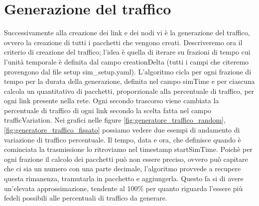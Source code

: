 \documentclass[binding=0.6cm]{sapthesis}
\begin{document}
\section{Generazione del traffico}
Successivamente alla creazione dei link e dei nodi vi è la generazione del traffico, ovvero la creazione di tutti i pacchetti che vengono
creati. Descriveremo ora il criterio di creazione del traffico; l'idea è quella di iterare su frazioni di tempo cui l'unità temporale è definita
 dal campo creationDelta (tutti i campi che citeremo provengono dal file setup sim\_setup.yaml). L'algoritmo cicla per ogni frazione di 
 tempo per la durata della generazione, definita nel campo
 simTime e per ciascuna calcola un quantitativo di pacchetti, proporzionale alla 
percentuale di traffico, per ogni link presente nella rete. Ogni secondo trascorso viene cambiata la percentuale di traffico di ogni link secondo
la scelta fatta nel campo trafficVariation. Nei grafici nelle figure \ref{fig:generatore_traffico_random}, \ref{fig:generatore_traffico_fissato} possiamo vedere due esempi di andamento di variazione di traffico percentuale.
Il tempo, data e ora, che definisce quando è cominciata la trasmissione lo ritroviamo nel timestamp startSimTime.
Poichè per ogni frazione il calcolo dei pacchetti può non essere preciso, ovvero può capitare che ci sia un numero con una parte decimale, l'algoritmo
provvede a recupere questa rimanenza, tramutarla in pacchetto e aggiungerla. Questo fa si di avere un'elevata approssimazione, tendente al 100\% per
quanto riguarda l'essere più fedeli possibili alle percentuali di traffico da generare.
\end{document}
